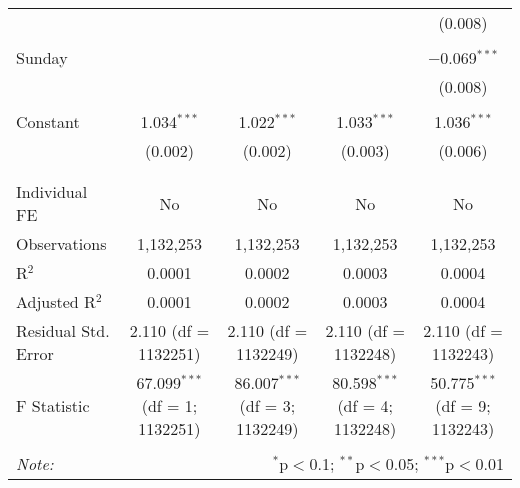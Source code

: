 \documentclass[
]{article}
\begin{document}
\begin{table}[!htbp]
{\begin{tabular}{@{\extracolsep{5pt}}lcccc}
  &  &  &  & (0.008) \\ 
  & & & & \\ 
 Sunday &  &  &  & $-$0.069$^{***}$ \\ 
  &  &  &  & (0.008) \\ 
  & & & & \\ 
 Constant & 1.034$^{***}$ & 1.022$^{***}$ & 1.033$^{***}$ & 1.036$^{***}$ \\ 
  & (0.002) & (0.002) & (0.003) & (0.006) \\ 
  & & & & \\ 
\hline \\[-1.8ex] 
Individual FE & No & No & No & No \\ 
Observations & 1,132,253 & 1,132,253 & 1,132,253 & 1,132,253 \\ 
R$^{2}$ & 0.0001 & 0.0002 & 0.0003 & 0.0004 \\ 
Adjusted R$^{2}$ & 0.0001 & 0.0002 & 0.0003 & 0.0004 \\ 
Residual Std. Error & 2.110 (df = 1132251) & 2.110 (df = 1132249) & 2.110 (df = 1132248) & 2.110 (df = 1132243) \\ 
F Statistic & 67.099$^{***}$ (df = 1; 1132251) & 86.007$^{***}$ (df = 3; 1132249) & 80.598$^{***}$ (df = 4; 1132248) & 50.775$^{***}$ (df = 9; 1132243) \\ 
\hline 
\hline \\[-1.8ex] 
\textit{Note:}  & \multicolumn{4}{r}{$^{*}$p$<$0.1; $^{**}$p$<$0.05; $^{***}$p$<$0.01} \\ 
\end{tabular}
} 
\end{table} 
\newpage
\end{document}
